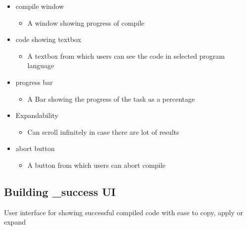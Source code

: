 \documentclass[conference]{IEEEtran}
\begin{document}
\begin{itemize}
\begin{itemize}
\begin{itemize}
\begin{itemize} 
  \item compile window
  \begin{itemize}
    \item A window showing progress of compile
  \end{itemize}
  \item code showing textbox
  \begin{itemize}
    \item A textbox from which users can see the code in selected program language
  \end{itemize}
  \item progress bar
  \begin{itemize}
    \item A Bar showing the progress of the task as a percentage
  \end{itemize}
  \item Expandability   
  \begin{itemize}
    \item Can scroll infinitely in case there are lot of results
  \end{itemize}
  \item abort button
  \begin{itemize}
    \item A button from which users can abort compile
  \end{itemize}
\end{itemize}
\textit{ }


\subsection{Building \compile_success UI}
 User interface for showing successful compiled code with ease to copy, apply or expand


\end{itemize}
\end{itemize}
\end{itemize}
\end{document}
